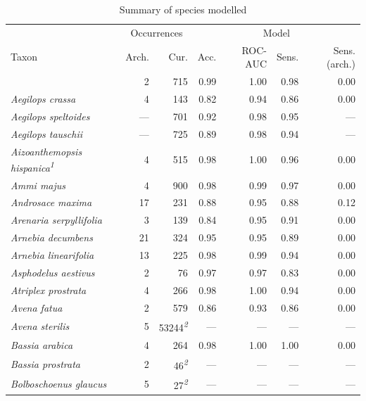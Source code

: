 \documentclass[
  authoryear,
  preprint]{elsarticle}
\begin{document}
\begingroup
\setlength{}
\setlength{}\fontsize{8.2pt}{9.9pt}\selectfont
\setlength{\LTpost}{0mm}

\begin{longtable}{@{\extracolsep{\fill}}lrrrrrr}

\caption{\label{tbl-results-summary}Summary of species modelled}

\tabularnewline

\toprule
 & \multicolumn{2}{c}{Occurrences} & \multicolumn{4}{c}{Model} \\ 
\cmidrule(lr){2-3} \cmidrule(lr){4-7}
Taxon & Arch. & Cur. & Acc. & ROC-AUC & Sens. & Sens. (arch.) \\ 
\midrule\addlinespace[2.5pt]
{\itshape Adonis dentata} & 2 & 715 & 0.99 & 1.00 & 0.98 & 0.00 \\ 
{\itshape Aegilops crassa} & 4 & 143 & 0.82 & 0.94 & 0.86 & 0.00 \\ 
{\itshape Aegilops speltoides} & — & 701 & 0.92 & 0.98 & 0.95 & — \\ 
{\itshape Aegilops tauschii} & — & 725 & 0.89 & 0.98 & 0.94 & — \\ 
{\itshape Aizoanthemopsis hispanica}\textsuperscript{\textit{1}} & 4 & 515 & 0.98 & 1.00 & 0.96 & 0.00 \\ 
{\itshape Ammi majus} & 4 & 900 & 0.98 & 0.99 & 0.97 & 0.00 \\ 
{\itshape Androsace maxima} & 17 & 231 & 0.88 & 0.95 & 0.88 & 0.12 \\ 
{\itshape Arenaria serpyllifolia} & 3 & 139 & 0.84 & 0.95 & 0.91 & 0.00 \\ 
{\itshape Arnebia decumbens} & 21 & 324 & 0.95 & 0.95 & 0.89 & 0.00 \\ 
{\itshape Arnebia linearifolia} & 13 & 225 & 0.98 & 0.99 & 0.94 & 0.00 \\ 
{\itshape Asphodelus aestivus} & 2 & 76 & 0.97 & 0.97 & 0.83 & 0.00 \\ 
{\itshape Atriplex prostrata} & 4 & 266 & 0.98 & 1.00 & 0.94 & 0.00 \\ 
{\itshape Avena fatua} & 2 & 579 & 0.86 & 0.93 & 0.86 & 0.00 \\ 
{\itshape Avena sterilis} & 5 & 53244\textsuperscript{\textit{2}} & — & — & — & — \\ 
{\itshape Bassia arabica} & 4 & 264 & 0.98 & 1.00 & 1.00 & 0.00 \\ 
{\itshape Bassia prostrata} & 2 & 46\textsuperscript{\textit{2}} & — & — & — & — \\ 
{\itshape Bolboschoenus glaucus} & 5 & 27\textsuperscript{\textit{2}} & — & — & — & — \\ 

\end{longtable}
\end{document}
